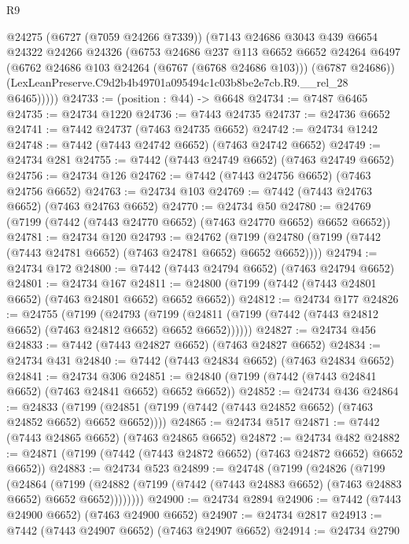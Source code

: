 \begin{lexlean}{R9}
\begin{coremodule}
          @24275
          (@6727 (@7059 @24266 @7339))
          (@7143
            @24686
            @3043
            @439
            @6654
            @24322
            @24266
            @24326
            (@6753
              @24686
              @237
              @113
              @6652
              @6652
              @24264
              @6497
              (@6762 @24686 @103 @24264 (@6767 (@6768 @24686 @103)))
              (@6787 @24686))
            (LexLeanPreserve.C9d2b4b49701a095494c1c03b8be2e7cb.R9.__rel_28 @6465)))))
@24733 := (position : @44) -> @6648
@24734 := @7487 @6465
@24735 := @24734 @1220
@24736 := @7443 @24735
@24737 := @24736 @6652
@24741 := @7442 @24737 (@7463 @24735 @6652)
@24742 := @24734 @1242
@24748 := @7442 (@7443 @24742 @6652) (@7463 @24742 @6652)
@24749 := @24734 @281
@24755 := @7442 (@7443 @24749 @6652) (@7463 @24749 @6652)
@24756 := @24734 @126
@24762 := @7442 (@7443 @24756 @6652) (@7463 @24756 @6652)
@24763 := @24734 @103
@24769 := @7442 (@7443 @24763 @6652) (@7463 @24763 @6652)
@24770 := @24734 @50
@24780 := @24769 (@7199 (@7442 (@7443 @24770 @6652) (@7463 @24770 @6652) @6652 @6652))
@24781 := @24734 @120
@24793 := @24762
    (@7199 (@24780 (@7199 (@7442 (@7443 @24781 @6652) (@7463 @24781 @6652) @6652 @6652))))
@24794 := @24734 @172
@24800 := @7442 (@7443 @24794 @6652) (@7463 @24794 @6652)
@24801 := @24734 @167
@24811 := @24800 (@7199 (@7442 (@7443 @24801 @6652) (@7463 @24801 @6652) @6652 @6652))
@24812 := @24734 @177
@24826 := @24755
    (@7199
      (@24793
        (@7199 (@24811 (@7199 (@7442 (@7443 @24812 @6652) (@7463 @24812 @6652) @6652 @6652))))))
@24827 := @24734 @456
@24833 := @7442 (@7443 @24827 @6652) (@7463 @24827 @6652)
@24834 := @24734 @431
@24840 := @7442 (@7443 @24834 @6652) (@7463 @24834 @6652)
@24841 := @24734 @306
@24851 := @24840 (@7199 (@7442 (@7443 @24841 @6652) (@7463 @24841 @6652) @6652 @6652))
@24852 := @24734 @436
@24864 := @24833
    (@7199 (@24851 (@7199 (@7442 (@7443 @24852 @6652) (@7463 @24852 @6652) @6652 @6652))))
@24865 := @24734 @517
@24871 := @7442 (@7443 @24865 @6652) (@7463 @24865 @6652)
@24872 := @24734 @482
@24882 := @24871 (@7199 (@7442 (@7443 @24872 @6652) (@7463 @24872 @6652) @6652 @6652))
@24883 := @24734 @523
@24899 := @24748
    (@7199
      (@24826
        (@7199
          (@24864
            (@7199
              (@24882 (@7199 (@7442 (@7443 @24883 @6652) (@7463 @24883 @6652) @6652 @6652))))))))
@24900 := @24734 @2894
@24906 := @7442 (@7443 @24900 @6652) (@7463 @24900 @6652)
@24907 := @24734 @2817
@24913 := @7442 (@7443 @24907 @6652) (@7463 @24907 @6652)
@24914 := @24734 @2790

\end{coremodule}
\end{lexlean}
